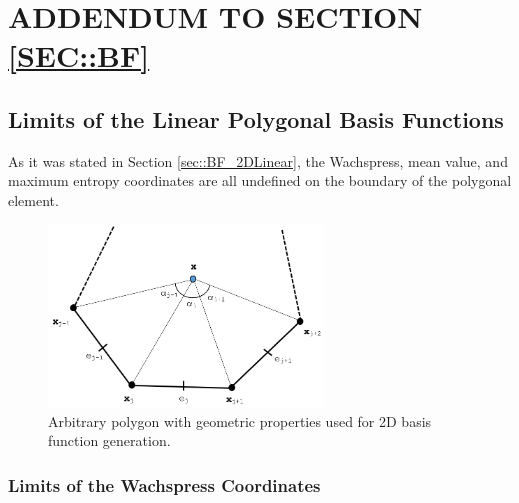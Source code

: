 %
%
%

\chapter{\uppercase{Addendum to Section \ref{sec::BF}}}
\label{sec::appendix_BF}

\section{Limits of the Linear Polygonal Basis Functions}
\label{sec::appendix_BF_Limits}

As it was stated in Section \ref{sec::BF_2DLinear}, the Wachspress, mean value, and maximum entropy coordinates are all undefined on the boundary of the polygonal element. 

\begin{figure}[hbt]
\centering
\includegraphics[width=0.65\textwidth]{figures/appendices/ref_polygon.png}
\caption{Arbitrary polygon with geometric properties used for 2D basis function generation.}
\label{fig::App_BF_2D_ref_polygon}
\end{figure}

\subsection{Limits of the Wachspress Coordinates}
\label{sec::appendix_BF_Limits_Wachspress}

